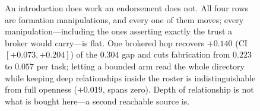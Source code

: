 \begin{figure}[t]
\caption{An introduction does work an endorsement does not. All four rows are formation
manipulations, and every one of them moves; every  manipulation---including
the ones asserting exactly the trust a broker would carry---is flat. One brokered hop
recovers $+0.140$ (CI $[+0.073, +0.204]$) of the $0.304$ gap and cuts fabrication from
$0.223$ to $0.057$ per task; letting a bounded arm read the whole directory while keeping
deep relationships inside the roster is indistinguishable from full openness ($+0.019$,
spans zero). Depth of relationship is not what is bought here---a second reachable source
is.}
\label{fig:ladder}
\end{figure}
